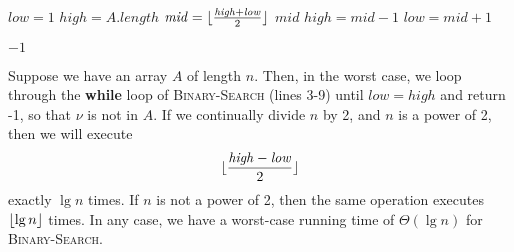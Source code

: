 
\begin{algorithmic}[1]
    \STATE $\mathit{low} = 1$
    \STATE $\mathit{high} = A.\mathit{length}$
        \STATE $\mathit{mid} = \lfloor\frac{\mathit{high} + \mathit{low}}{2}\rfloor$
            \RETURN $\mathit{mid}$
            \STATE $\mathit{high} = \mathit{mid} - 1$
        \ELSE
            \STATE $\mathit{low} = \mathit{mid} + 1$
        \ENDIF
    \ENDWHILE

    \RETURN $-1$
\end{algorithmic}

Suppose we have an array $A$ of length $n$. Then, in the worst case, we loop through
the \textbf{while} loop of \textsc{Binary-Search} (lines 3-9) until 
$\mathit{low} = \mathit{high}$ and return -1, so that $\nu$ is not in $A$. If we
continually divide $n$ by 2, and $n$ is a power of 2, then we will execute 
\[
    \lfloor\frac{\mathit{high} - \mathit{low}}{2}\rfloor
\]
exactly $\lg{n}$ times. If $n$ is not a power of 2, then the same operation
executes $\lfloor\lg{n}\rfloor$ times. In any case, we have a worst-case running time of
$\Theta(\lg{n})$ for \textsc{Binary-Search}.
